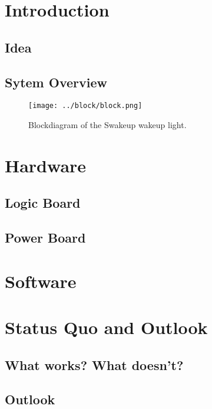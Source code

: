 \documentclass{report}
\begin{document}


\chapter{Introduction}
\label{chap:intro}
\section{Idea}
\label{sec:idea}
\section{Sytem Overview}
\label{sec:system}
\begin{figure}[H]
	\centering
	\label{fig:block}
	\texttt{[image: ../block/block.png]}
	\caption{Blockdiagram of the Swakeup wakeup light.}
\end{figure}

\chapter{Hardware}
\label{chap:hardware}
\section{Logic Board}
\label{sec:logic}
\section{Power Board}
\label{sec:power}

\chapter{Software}
\label{chap:software}

\chapter{Status Quo and Outlook}
\label{chap:status}
\section{What works? What doesn't?}
\label{sec:what}
\section{Outlook}
\label{sec:outlook}
\end{document}
